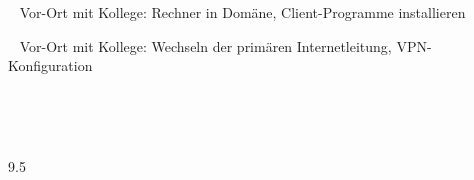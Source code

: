 {{	\textbullet~ Vor-Ort mit Kollege: Rechner in Domäne, Client-Programme installieren\par
	\textbullet~ Vor-Ort mit Kollege: Wechseln der primären Internetleitung, VPN-Konfiguration\par
	\textbullet~ \par
	\textbullet~ 
	}{}{9.5}
}{}
\Unterschrift
\newpage

